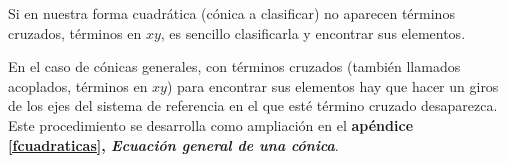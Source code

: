 \vspace{5mm}
\begin{adjustwidth}{25pt}{25pt}
\begin{destacado}

Si en nuestra forma cuadrática (cónica a clasificar) no aparecen términos cruzados, términos en $xy$, es sencillo clasificarla y encontrar sus elementos. 

En el caso 	de cónicas generales, con términos cruzados (también llamados acoplados, términos en $xy$) para encontrar sus elementos hay que hacer un giros de los ejes del sistema de referencia en el que esté término cruzado desaparezca. Este procedimiento se desarrolla como ampliación en el \textbf{apéndice \ref{fcuadraticas}, \emph{Ecuación general de una cónica}}.
\end{destacado}
\end{adjustwidth}
\vspace{5mm}


